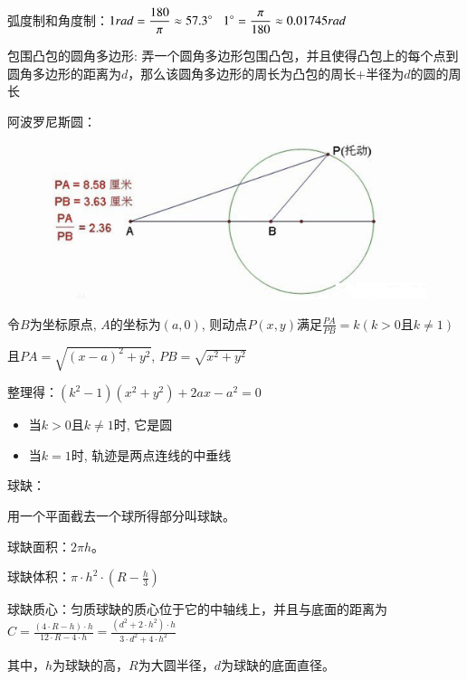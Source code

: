 弧度制和角度制：$\displaystyle 1rad = \frac{180}{\pi} \approx 57.3\degree\;\;\; 1\degree = \frac{\pi}{180} \approx 0.01745rad$\par

包围凸包的圆角多边形: 弄一个圆角多边形包围凸包，并且使得凸包上的每个点到圆角多边形的距离为$d$，那么该圆角多边形的周长为凸包的周长$+$半径为$d$的圆的周长\par

阿波罗尼斯圆：\par

\begin{figure}[ht]
\centering  %
\includegraphics[scale=0.35]{images/Apollonius_circle.png} %
\end{figure}

令$B$为坐标原点, $A$的坐标为$(a, 0)$, 则动点$P(x, y)$满足$\displaystyle \frac{PA}{PB} = k(k > 0 \mbox{且} k \neq 1)$\par
且$\displaystyle PA = \sqrt{(x - a)^2 + y^2}$, $\displaystyle PB = \sqrt{x^2 + y^2}$\par
整理得：$\displaystyle (k^2 - 1)(x^2 + y^2) + 2ax - a^2 = 0$\par
\begin{itemize}
\item 当$k > 0 \mbox{且} k \neq 1$时, 它是圆
\item 当$k = 1$时, 轨迹是两点连线的中垂线
\end{itemize}

球缺：\par
用一个平面截去一个球所得部分叫球缺。\par
球缺面积：$\displaystyle 2\pi h$。\par
球缺体积：$\displaystyle \pi \cdot h^2 \cdot (R - \frac{h}{3})$\par
球缺质心：匀质球缺的质心位于它的中轴线上，并且与底面的距离为$\displaystyle C = \frac{(4\cdot R - h) \cdot h}{12 \cdot R - 4 \cdot h} = \frac{(d^2 + 2\cdot h^2) \cdot h}{3\cdot d^2 + 4\cdot h^2}$\par
其中，$h$为球缺的高，$R$为大圆半径，$d$为球缺的底面直径。\par

